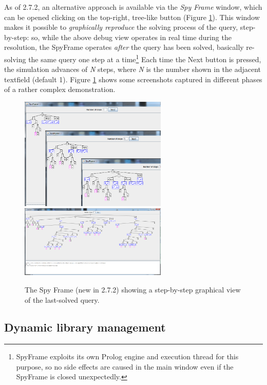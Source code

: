 As of \tuprolog{} 2.7.2, an alternative approach is available via the \textit{Spy Frame} window, which can be opened clicking on the top-right, tree-like button (Figure \ref{fig:gui-spyframe}).
This window makes it possible to \textit{graphically reproduce} the solving process of the query, step-by-step: so, while the above debug view operates in real time during the resolution, the SpyFrame operates \textit{after} the query has been solved, basically re-solving the same query one step at a time\footnote{%
    SpyFrame exploits its own Prolog engine and execution thread for this purpose, so no side effects are caused in the main window even if the SpyFrame is closed unexpectedly.}
%
Each time the Next button is pressed, the simulation advances of \textit{N} steps, where \textit{N} is the number shown in the adjacent textfield (default 1).
Figure \ref{fig:gui-spyframe} shows some screenshots captured in different phases of a rather complex demonstration.

\begin{figure}
\centering
\includegraphics[width=7cm]{images/gui-spyframe1}
\includegraphics[width=7cm]{images/gui-spyframe2}
\caption{The Spy Frame (new in \tuprolog{} 2.7.2) showing a step-by-step graphical view of the last-solved query.}
\label{fig:gui-spyframe}
\end{figure}


\subsection{Dynamic library management}
\label{ssec:dynamic-library-management}

